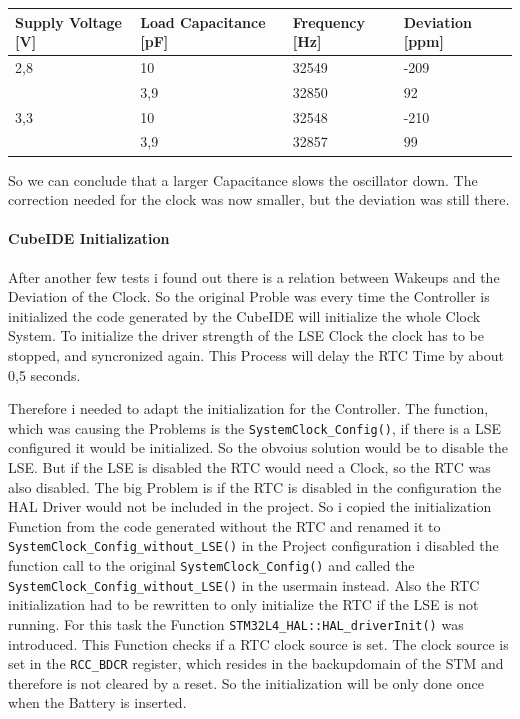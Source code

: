 \begin{tabular}{|l|l|l|l|}
\hline
Supply Voltage {[}V{]} & Load Capacitance {[}pF{]} & Frequency {[}Hz{]} & Deviation {[}ppm{]} \\ \hline
2,8   & 10                        & 32549              & -209                \\ \cline{2-4} 
                       & 3,9                       & 32850              & 92                  \\ \hline
3,3   & 10                        & 32548              & -210                \\ \cline{2-4} 
                       & 3,9                       & 32857              & 99                  \\ \hline
\end{tabular}
\vspace{1cm}

So we can conclude that a larger Capacitance slows the oscillator down. The correction needed for the clock was now smaller, but the deviation was still there.

\paragraph{CubeIDE Initialization}
After another few tests i found out there is a relation between Wakeups and the Deviation of the Clock. So the original Proble was every time the Controller is initialized the code generated by the CubeIDE will initialize the whole Clock System. To initialize the driver strength of the LSE Clock the clock has to be stopped, and syncronized again. This Process will delay the RTC Time by about 0,5 seconds.

Therefore i needed to adapt the initialization for the Controller. The function, which was causing the Problems is the \verb!SystemClock_Config()!, if there is a LSE configured it would be initialized. So the obvoius solution would be to disable the LSE. But if the LSE is disabled the RTC would need a Clock, so the RTC was also disabled. The big Problem is if the RTC is disabled in the configuration the HAL Driver would not be included in the project. So i copied the initialization Function from the code generated without the RTC and renamed it to \verb!SystemClock_Config_without_LSE()! in the Project configuration i disabled the function call to the original \verb!SystemClock_Config()! and called the \verb!SystemClock_Config_without_LSE()! in the usermain instead. Also the RTC initialization had to be rewritten to only initialize the RTC if the LSE is not running. For this task the Function \verb!STM32L4_HAL::HAL_driverInit()! was introduced. This Function checks if a RTC clock source is set. The clock source is set in the \verb!RCC_BDCR! register, which resides in the backupdomain of the STM and therefore is not cleared by a reset. So the initialization will be only done once when the Battery is inserted.

